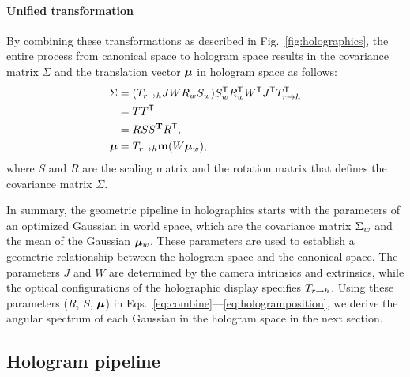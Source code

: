 \paragraph{\textbf{Unified transformation}}
By combining these transformations as described in Fig.~\ref{fig:holographics}, the entire process from canonical space to hologram space results in the covariance matrix $\Sigma$ and the translation vector ${\bm{\mu}}$ in hologram space as follows:
\begin{align}
  \Sigma &= (T_{r \rightarrow h} J W R_w S_w) S_w^\mathsf{T} R_w^\mathsf{T} W^\mathsf{T} J^\mathsf{T} T_{r \rightarrow h}^\mathsf{T} \label{eq:combine}\\
  &= TT^\mathsf{T} \\
  &= RSS^\mathbf{T}R^\mathsf{T}, \\
    {\bm{\mu}} &= T_{r \rightarrow h} \mathbf{m} (W{\bm{\mu}}_w), \label{eq:hologramposition}
\end{align}
where $S$ and $R$ are the scaling matrix and the rotation matrix that defines the covariance matrix $\Sigma$.

In summary, the geometric pipeline in holographics starts with the parameters of an optimized Gaussian in world space, which are the covariance matrix $\Sigma_w$ and the mean of the Gaussian ${\bm{\mu}}_w$. These parameters are used to establish a geometric relationship between the hologram space and the canonical space. The parameters $J$ and $W$ are determined by the camera intrinsics and extrinsics, while the optical configurations of the holographic display specifies $T_{r \rightarrow h}$. Using these parameters ($R$, $S$, ${\bm{\mu}}$) in Eqs.~\ref{eq:combine}---\ref{eq:hologramposition}, we derive the angular spectrum of each Gaussian in the hologram space in the next section.


\subsection{Hologram pipeline}

